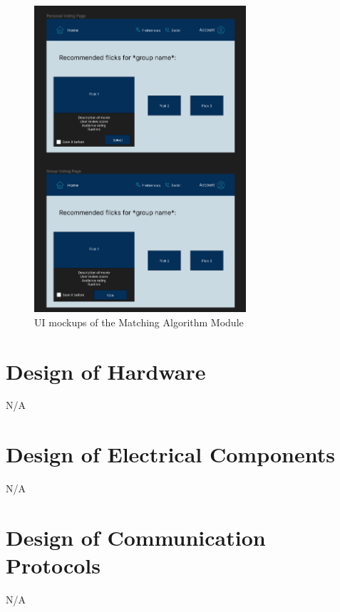 \documentclass[12pt, titlepage]{article}
\begin{document}
\begin{figure}[H]
	\centering
	\includegraphics[width=0.7\textwidth]{figma/voting.png}
	\caption{UI mockups of the Matching Algorithm Module}
	\label{FigUH}
\end{figure}



\section{Design of Hardware}
N/A

\section{Design of Electrical Components}
N/A

\section{Design of Communication Protocols}
N/A
\end{document}
